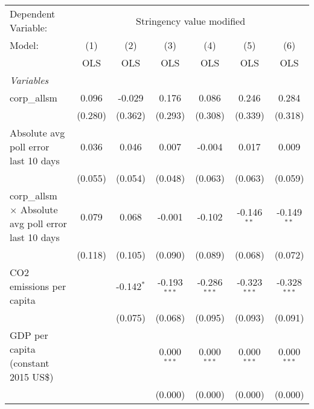 
\begingroup
\centering
\begin{tabular}{lcccccc}
   \toprule
   Dependent Variable: & \multicolumn{6}{c}{Stringency value modified}\\
   Model:                                                      & (1)     & (2)          & (3)            & (4)            & (5)            & (6)\\  
                                                               &  OLS    & OLS          & OLS            & OLS            & OLS            & OLS\\  
   \midrule
   \emph{Variables}\\
   corp\_allsm                                                 & 0.096   & -0.029       & 0.176          & 0.086          & 0.246          & 0.284\\   
                                                               & (0.280) & (0.362)      & (0.293)        & (0.308)        & (0.339)        & (0.318)\\   
   Absolute avg poll error last 10 days                        & 0.036   & 0.046        & 0.007          & -0.004         & 0.017          & 0.009\\   
                                                               & (0.055) & (0.054)      & (0.048)        & (0.063)        & (0.063)        & (0.059)\\   
   corp\_allsm $\times$ Absolute avg poll error last 10 days   & 0.079   & 0.068        & -0.001         & -0.102         & -0.146$^{**}$  & -0.149$^{**}$\\   
                                                               & (0.118) & (0.105)      & (0.090)        & (0.089)        & (0.068)        & (0.072)\\   
   CO2 emissions per capita                                    &         & -0.142$^{*}$ & -0.193$^{***}$ & -0.286$^{***}$ & -0.323$^{***}$ & -0.328$^{***}$\\   
                                                               &         & (0.075)      & (0.068)        & (0.095)        & (0.093)        & (0.091)\\   
   GDP per capita (constant 2015 US\$)                         &         &              & 0.000$^{***}$  & 0.000$^{***}$  & 0.000$^{***}$  & 0.000$^{***}$\\   
                                                               &         &              & (0.000)        & (0.000)        & (0.000)        & (0.000)\\   

\end{tabular}
